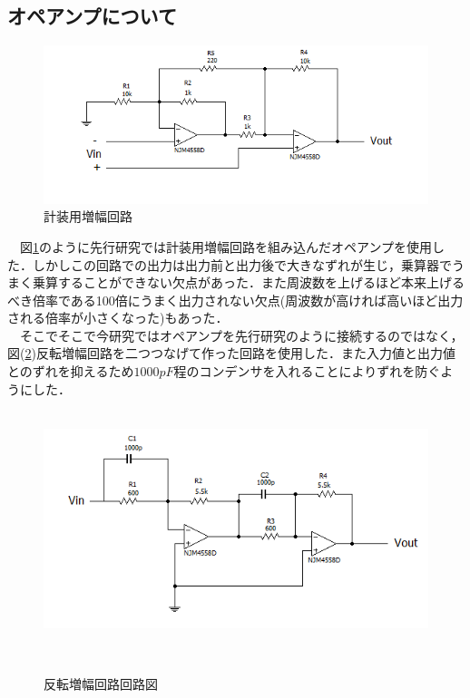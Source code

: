 \documentclass[12pt]{jarticle}
\begin{document}
\subsection{オペアンプについて}
\begin{figure}[H]
	\centering
	\includegraphics[]{senkou.png}
	\caption{計装用増幅回路}
	\label{fig:zouhuku}
\end{figure}
　図\ref{fig:zouhuku}のように先行研究では計装用増幅回路を組み込んだオペアンプを使用した．しかしこの回路での出力は出力前と出力後で大きなずれが生じ，乗算器でうまく乗算することができない欠点があった．また周波数を上げるほど本来上げるべき倍率である100倍にうまく出力されない欠点(周波数が高ければ高いほど出力される倍率が小さくなった)もあった．\\　そこでそこで今研究ではオペアンプを先行研究のように接続するのではなく，図(\ref{fig:hanten2})反転増幅回路を二つつなげて作った回路を使用した．また入力値と出力値とのずれを抑えるため$1000pF$程のコンデンサを入れることによりずれを防ぐようにした．
　\begin{figure}[H]
　	\centering
　	\includegraphics[]{hanten2.png}
　	\caption{反転増幅回路回路図}
　	\label{fig:hanten2}
　\end{figure}
\end{document}
